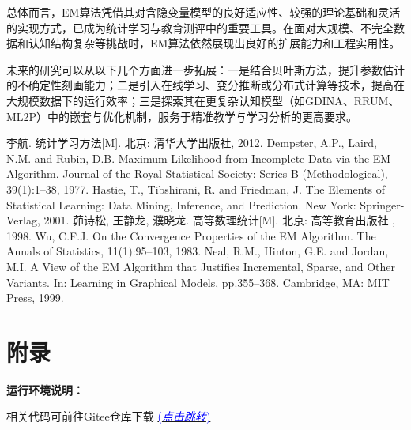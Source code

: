 \documentclass[a4paper,12pt]{ctexart} %
\begin{document}
总体而言，EM算法凭借其对含隐变量模型的良好适应性、较强的理论基础和灵活的实现方式，已成为统计学习与教育测评中的重要工具。在面对大规模、不完全数据和认知结构复杂等挑战时，EM算法依然展现出良好的扩展能力和工程实用性。

未来的研究可以从以下几个方面进一步拓展：一是结合贝叶斯方法，提升参数估计的不确定性刻画能力；二是引入在线学习、变分推断或分布式计算等技术，提高在大规模数据下的运行效率；三是探索其在更复杂认知模型（如GDINA、RRUM、ML2P）中的嵌套与优化机制，服务于精准教学与学习分析的更高要求。

\begin{thebibliography}{99}
     李航. 统计学习方法[M]. 北京: 清华大学出版社, 2012.
     Dempster, A.P., Laird, N.M. and Rubin, D.B. Maximum Likelihood from Incomplete Data via the EM Algorithm. Journal of the Royal Statistical Society: Series B (Methodological), 39(1):1--38, 1977.
     Hastie, T., Tibshirani, R. and Friedman, J. The Elements of Statistical Learning: Data Mining, Inference, and Prediction. New York: Springer-Verlag, 2001.
     茆诗松, 王静龙, 濮晓龙. 高等数理统计[M]. 北京: 高等教育出版社 , 1998.
     Wu, C.F.J. On the Convergence Properties of the EM Algorithm. The Annals of Statistics, 11(1):95--103, 1983.
     Neal, R.M., Hinton, G.E. and Jordan, M.I. A View of the EM Algorithm that Justifies Incremental, Sparse, and Other Variants. In: Learning in Graphical Models, pp.355--368. Cambridge, MA: MIT Press, 1999.
\end{thebibliography}
\newpage
\appendix
\section{附录}
\textbf{运行环境说明：}

\vspace{10pt}

\vspace{5pt}

相关代码可前往Gitee仓库下载
\href{https://gitee.com/linlangtians/simple-tutorial-and-application-of-em-algorithm.git}{\textcolor{blue}{(\textit{点击跳转})}}
\end{document}
